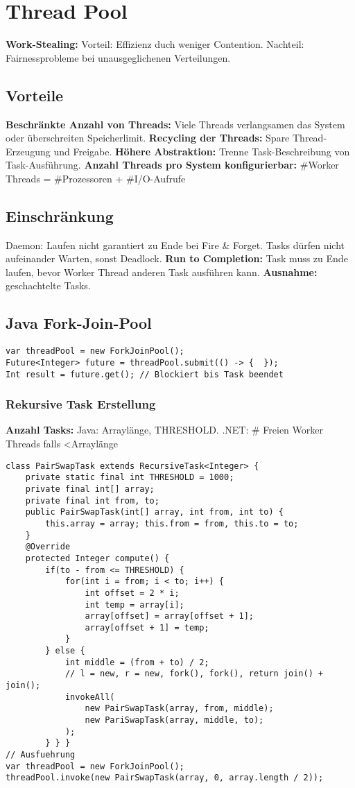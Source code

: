 \section{Thread Pool}
\textbf{Work-Stealing:} Vorteil: Effizienz duch weniger Contention.
Nachteil: Fairnessprobleme bei unausgeglichenen Verteilungen.
\subsection{Vorteile}
\textbf{Beschränkte Anzahl von Threads:} Viele Threads verlangsamen das System oder überschreiten Speicherlimit. 
\textbf{Recycling der Threads:} Spare Thread-Erzeugung und Freigabe.
\textbf{Höhere Abstraktion:} Trenne Task-Beschreibung von Task-Ausführung.
\textbf{Anzahl Threads pro System konfigurierbar:} \#Worker Threads = \#Prozessoren + \#I/O-Aufrufe 

\subsection{Einschränkung}
Daemon: Laufen nicht garantiert zu Ende bei Fire \& Forget.
Tasks dürfen nicht aufeinander Warten, sonst Deadlock.
\textbf{Run to Completion:} Task muss zu Ende laufen, bevor Worker Thread anderen Task ausführen kann.
\textbf{Ausnahme:} geschachtelte Tasks.

\subsection{Java Fork-Join-Pool}
\begin{lstlisting}
var threadPool = new ForkJoinPool();
Future<Integer> future = threadPool.submit(() -> {  });
Int result = future.get(); // Blockiert bis Task beendet
\end{lstlisting}

\subsubsection{Rekursive Task Erstellung}
\textbf{Anzahl Tasks:} Java: Arraylänge, THRESHOLD.
.NET: \# Freien Worker Threads falls \textless Arraylänge
\begin{lstlisting}
class PairSwapTask extends RecursiveTask<Integer> {
    private static final int THRESHOLD = 1000;
    private final int[] array;
    private final int from, to;
    public PairSwapTask(int[] array, int from, int to) {
        this.array = array; this.from = from, this.to = to;
    }
    @Override
    protected Integer compute() {
        if(to - from <= THRESHOLD) {
            for(int i = from; i < to; i++) {
                int offset = 2 * i;
                int temp = array[i];
                array[offset] = array[offset + 1];
                array[offset + 1] = temp;
            }
        } else {
            int middle = (from + to) / 2;
            // l = new, r = new, fork(), fork(), return join() + join();
            invokeAll(
                new PairSwapTask(array, from, middle);
                new PariSwapTask(array, middle, to);
            );
        } } }
// Ausfuehrung 
var threadPool = new ForkJoinPool();
threadPool.invoke(new PairSwapTask(array, 0, array.length / 2));
\end{lstlisting}

